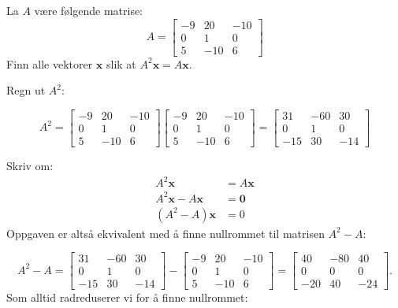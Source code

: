 \documentclass[titlepage,a4paper,12pt,norsk]{IMFeksamen}
\DeclareMathOperator{\Sp}{Sp}
\newcommand{\V}[1]{\mathbf{#1}}
\newcommand{\vvv}[3]{\begin{bmatrix} #1 \\ #2 \\ #3 \end{bmatrix}}
\newcommand{\x}{\V{x}}
\newcommand{\0}{\V{0}}
\begin{document}
\begin{oppgave}
La $A$ være følgende matrise:
\[
A =
\begin{bmatrix}
-9 &  20 & -10 \\
 0 &   1 &   0 \\
 5 & -10 &   6
\end{bmatrix}
\]
Finn alle vektorer $\x$ slik at $A^2 \x = A \x$.

Regn ut $A^2$:

\[
A^2=
\begin{bmatrix}
-9 &  20 & -10 \\
0 &   1 &   0 \\
5 & -10 &   6
\end{bmatrix}
\begin{bmatrix}
-9 &  20 & -10 \\
0 &   1 &   0 \\
5 & -10 &   6
\end{bmatrix}
=
\begin{bmatrix}
31 &  -60 & 30 \\
0 &   1 &   0 \\
-15 & 30 &   -14
\end{bmatrix}
\]

Skriv om: 
\begin{align*}
A^2\x&=A\x\\
A^2\x-A\x&=\0\\
(A^2-A)\x&=0
\end{align*}
Oppgaven er altså ekvivalent med å finne nullrommet til matrisen $A^2-A$:

\[
A^2-A=
\begin{bmatrix}
31 &  -60 & 30 \\
0 &   1 &   0 \\
-15 & 30 &   -14
\end{bmatrix}-
\begin{bmatrix}
-9 &  20 & -10 \\
0 &   1 &   0 \\
5 & -10 &   6
\end{bmatrix}
=
\begin{bmatrix}
40 &  -80 & 40 \\
0 &   0 &   0 \\
-20 & 40 &   -24
\end{bmatrix}.
\]
Som alltid radreduserer vi for å finne nullrommet:


\end{oppgave}
\end{document}
